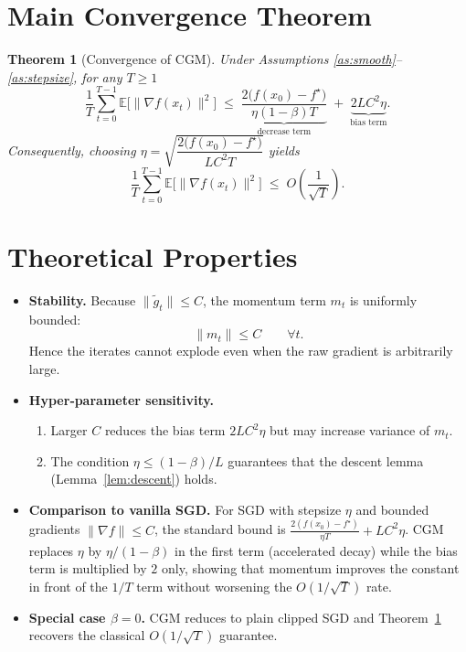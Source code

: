 \documentclass{article}
\newtheorem{theorem}{Theorem}
\newcommand{\E}{\mathbb{E}}
\begin{document}
\section*{Main Convergence Theorem}
\begin{theorem}[Convergence of CGM]\label{thm:main}
Under Assumptions \ref{as:smooth}–\ref{as:stepsize}, for any $T\ge1$
\[
\frac{1}{T}\sum_{t=0}^{T-1}\E\bigl[\|\nabla f(x_{t})\|^{2}\bigr]
\;\le\;
\underbrace{\frac{2\bigl(f(x_{0})-f^{\star}\bigr)}{\eta(1-\beta)T}}_{\displaystyle\text{decrease term}}
\;+\;
\underbrace{2L C^{2}\eta}_{\displaystyle\text{bias term}} .
\tag{1}
\]
Consequently, choosing $\eta=\sqrt{\dfrac{2\bigl(f(x_{0})-f^{\star}\bigr)}{L C^{2}T}}$
yields
\[
\frac{1}{T}\sum_{t=0}^{T-1}\E\bigl[\|\nabla f(x_{t})\|^{2}\bigr]
\;\le\;O\!\left(\frac{1}{\sqrt{T}}\right).
\]
\end{theorem}

\section*{Theoretical Properties}
\begin{itemize}[leftmargin=*]
\item \textbf{Stability.} Because $\|\tilde g_{t}\|\le C$, the momentum term $m_{t}$ is uniformly bounded:
\[
\|m_{t}\|\le C\qquad\forall t.
\]
Hence the iterates cannot explode even when the raw gradient is arbitrarily large.

\item \textbf{Hyper‑parameter sensitivity.}
  \begin{enumerate}
    \item Larger $C$ reduces the bias term $2LC^{2}\eta$ but may increase variance of $m_{t}$.
    \item The condition $\eta\le (1-\beta)/L$ guarantees that the descent lemma (Lemma~\ref{lem:descent}) holds.
  \end{enumerate}

\item \textbf{Comparison to vanilla SGD.}  
  For SGD with stepsize $\eta$ and bounded gradients $\|\nabla f\|\le C$, the standard bound is
  $\frac{2(f(x_{0})-f^{\star})}{\eta T}+L C^{2}\eta$.
  CGM replaces $\eta$ by $\eta/(1-\beta)$ in the first term (accelerated decay) while the bias term is multiplied by $2$ only, showing that momentum improves the constant in front of the $1/T$ term without worsening the $O(1/\sqrt{T})$ rate.

\item \textbf{Special case $\beta=0$.}  CGM reduces to plain clipped SGD and Theorem~\ref{thm:main} recovers the classical $O(1/\sqrt{T})$ guarantee.
\end{itemize}
\end{document}

